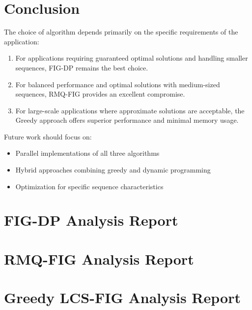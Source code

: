 \documentclass[12pt]{article}
\begin{document}
\section{Conclusion}
The choice of algorithm depends primarily on the specific requirements of the application:
\begin{enumerate}
    \item For applications requiring guaranteed optimal solutions and handling smaller sequences, FIG-DP remains the best choice.
    \item For balanced performance and optimal solutions with medium-sized sequences, RMQ-FIG provides an excellent compromise.
    \item For large-scale applications where approximate solutions are acceptable, the Greedy approach offers superior performance and minimal memory usage.
\end{enumerate}

Future work should focus on:
\begin{itemize}
    \item Parallel implementations of all three algorithms
    \item Hybrid approaches combining greedy and dynamic programming
    \item Optimization for specific sequence characteristics
\end{itemize}

\newpage

\appendix
\section{FIG-DP Analysis Report}


\newpage

\section{RMQ-FIG Analysis Report}


\newpage

\section{Greedy LCS-FIG Analysis Report}

\end{document}

